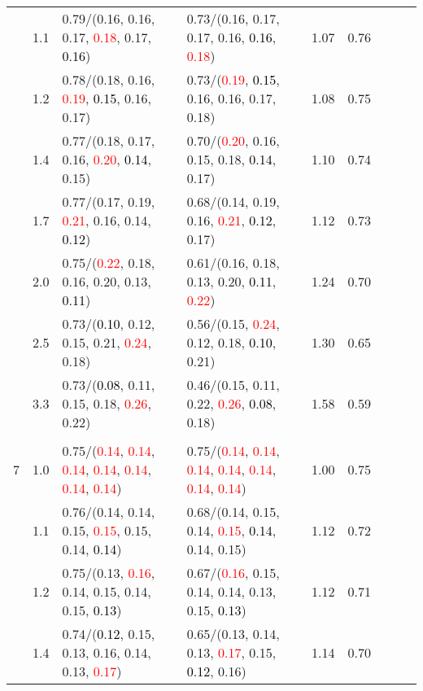 \documentclass[10pt,a4paper]{report}
\begin{document}
\begin{table}[!htbp]
\begin{center}
{\begin{tabular}{ccllccccc}
			&1.1&0.79/(0.16, 0.16, 0.17, \textcolor{red}{0.18}, 0.17, \textcolor{black}{0.16})&0.73/(0.16, 0.17, 0.17, 0.16, \textcolor{black}{0.16}, \textcolor{red}{0.18})&1.07&0.76\\
			&1.2&0.78/(0.18, 0.16, \textcolor{red}{0.19}, \textcolor{black}{0.15}, 0.16, 0.17)&0.73/(\textcolor{red}{0.19}, \textcolor{black}{0.15}, 0.16, 0.16, 0.17, 0.18)&1.08&0.75\\
			&1.4&0.77/(0.18, 0.17, 0.16, \textcolor{red}{0.20}, \textcolor{black}{0.14}, 0.15)&0.70/(\textcolor{red}{0.20}, 0.16, 0.15, 0.18, \textcolor{black}{0.14}, 0.17)&1.10&0.74\\
			&1.7&0.77/(0.17, 0.19, \textcolor{red}{0.21}, 0.16, 0.14, \textcolor{black}{0.12})&0.68/(0.14, 0.19, 0.16, \textcolor{red}{0.21}, \textcolor{black}{0.12}, 0.17)&1.12&0.73\\
			&2.0&0.75/(\textcolor{red}{0.22}, 0.18, 0.16, 0.20, 0.13, \textcolor{black}{0.11})&0.61/(0.16, 0.18, 0.13, 0.20, \textcolor{black}{0.11}, \textcolor{red}{0.22})&1.24&0.70\\
			&2.5&0.73/(\textcolor{black}{0.10}, 0.12, 0.15, 0.21, \textcolor{red}{0.24}, 0.18)&0.56/(0.15, \textcolor{red}{0.24}, 0.12, 0.18, \textcolor{black}{0.10}, 0.21)&1.30&0.65\\
			&3.3&0.73/(\textcolor{black}{0.08}, 0.11, 0.15, 0.18, \textcolor{red}{0.26}, 0.22)&0.46/(0.15, 0.11, 0.22, \textcolor{red}{0.26}, \textcolor{black}{0.08}, 0.18)&1.58&0.59\\
			&&&&\\
			7			&1.0&0.75/(\textcolor{red}{0.14}, \textcolor{red}{0.14}, \textcolor{red}{0.14}, \textcolor{red}{0.14}, \textcolor{red}{0.14}, \textcolor{red}{0.14}, \textcolor{red}{0.14})&0.75/(\textcolor{red}{0.14}, \textcolor{red}{0.14}, \textcolor{red}{0.14}, \textcolor{red}{0.14}, \textcolor{red}{0.14}, \textcolor{red}{0.14}, \textcolor{red}{0.14})&1.00&0.75\\
			&1.1&0.76/(0.14, 0.14, 0.15, \textcolor{red}{0.15}, 0.15, 0.14, \textcolor{black}{0.14})&0.68/(0.14, 0.15, 0.14, \textcolor{red}{0.15}, \textcolor{black}{0.14}, 0.14, 0.15)&1.12&0.72\\
			&1.2&0.75/(0.13, \textcolor{red}{0.16}, 0.14, 0.15, 0.14, 0.15, \textcolor{black}{0.13})&0.67/(\textcolor{red}{0.16}, 0.15, 0.14, 0.14, 0.13, 0.15, \textcolor{black}{0.13})&1.12&0.71\\
			&1.4&0.74/(\textcolor{black}{0.12}, 0.15, 0.13, 0.16, 0.14, 0.13, \textcolor{red}{0.17})&0.65/(0.13, 0.14, 0.13, \textcolor{red}{0.17}, 0.15, \textcolor{black}{0.12}, 0.16)&1.14&0.70\\

\end{tabular}}
\end{center}
\end{table}
\end{document}
